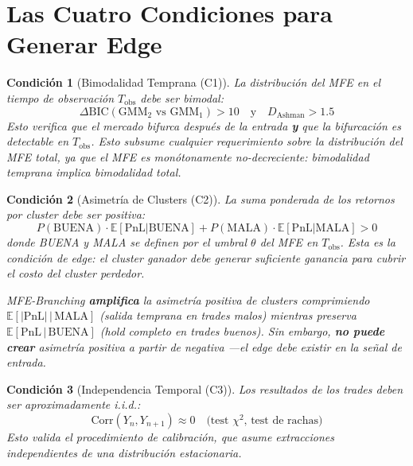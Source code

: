 \documentclass[11pt,a4paper]{article}
\newtheorem{condition}{Condición}
\begin{document}
\section{Las Cuatro Condiciones para Generar Edge}

\begin{condition}[Bimodalidad Temprana (C1)]
La distribución del MFE en el tiempo de observación $T_{\text{obs}}$ debe ser bimodal:
\begin{equation}
    \Delta\text{BIC}(\text{GMM}_2 \text{ vs } \text{GMM}_1) > 10 \quad \text{y} \quad D_{\text{Ashman}} > 1.5
\end{equation}
Esto verifica que el mercado bifurca después de la entrada \textbf{y} que la bifurcación es detectable en $T_{\text{obs}}$. Esto subsume cualquier requerimiento sobre la distribución del MFE total, ya que el MFE es monótonamente no-decreciente: bimodalidad temprana implica bimodalidad total.
\end{condition}

\begin{condition}[Asimetría de Clusters (C2)]
La suma ponderada de los retornos por cluster debe ser positiva:
\begin{equation}
    P(\text{BUENA}) \cdot \mathbb{E}[\text{PnL} | \text{BUENA}] + P(\text{MALA}) \cdot \mathbb{E}[\text{PnL} | \text{MALA}] > 0
\end{equation}
donde BUENA y MALA se definen por el umbral $\theta$ del MFE en $T_{\text{obs}}$. Esta es la condición de edge: el cluster ganador debe generar suficiente ganancia para cubrir el costo del cluster perdedor.

MFE-Branching \textbf{amplifica} la asimetría positiva de clusters comprimiendo $\mathbb{E}[|\text{PnL}| \,|\, \text{MALA}]$ (salida temprana en trades malos) mientras preserva $\mathbb{E}[\text{PnL} \,|\, \text{BUENA}]$ (hold completo en trades buenos). Sin embargo, \textbf{no puede crear} asimetría positiva a partir de negativa ---el edge debe existir en la señal de entrada.
\end{condition}

\begin{condition}[Independencia Temporal (C3)]
Los resultados de los trades deben ser aproximadamente i.i.d.:
\begin{equation}
    \text{Corr}(Y_n, Y_{n+1}) \approx 0 \quad \text{(test $\chi^2$, test de rachas)}
\end{equation}
Esto valida el procedimiento de calibración, que asume extracciones independientes de una distribución estacionaria.
\end{condition}
\end{document}
